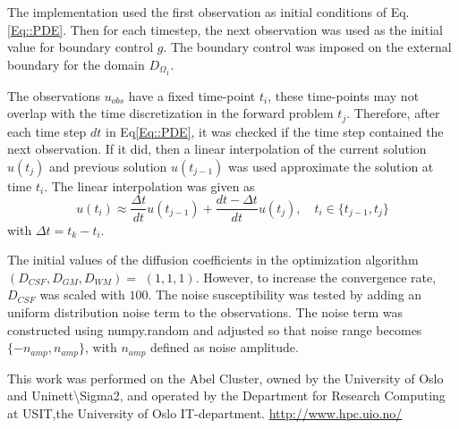 \documentclass[11pt,a4paper]{article}
\begin{document}
The implementation used the first observation as initial conditions of Eq.\ref{Eq::PDE}. Then for each timestep, the next observation was used as the initial value for boundary control $g$. The boundary control was imposed on the external boundary for the domain $D_{\Omega_1}$. 

The observations $u_{obs}$ have a fixed time-point $t_i$, these time-points may not overlap with the time discretization in the forward problem $t_j$. Therefore, after each time step $dt$ in Eq\ref{Eq::PDE}, it was checked if the time step contained the next observation. If it did, then a linear interpolation of the  current solution $u(t_j)$ and previous solution $u(t_{j-1})$ was used approximate the solution at time $t_i$. The linear interpolation was given as  
\begin{equation}
\label{observation:interpolation}
u(t_i) \approx \frac{\Delta t}{dt} u(t_{j-1}) + \frac{dt - \Delta t }{dt} u(t_{j}), \quad t_i \in \lbrace t_{j-1}, t_j \rbrace
\end{equation}
with $\Delta t = t_k-t_i $.  

The initial values of the diffusion coefficients in the optimization algorithm $(D_{CSF}, D_{GM}, D_{WM})=$  $(1, 1, 1)$. However, to increase the convergence rate, $D_{CSF}$ was scaled with $100$. 
The noise susceptibility was tested by adding an uniform distribution noise term to the observations. The noise term was constructed using numpy.random and adjusted so that noise range becomes $\lbrace -n_{amp} , n_{amp} \rbrace $, with $n_{amp}$ defined as noise amplitude. 

This work was performed on the Abel Cluster, owned by the University of Oslo and Uninett\textbackslash Sigma2, and operated by the Department for Research Computing at USIT,the University of Oslo IT-department. \url{http://www.hpc.uio.no/} 
\end{document}
